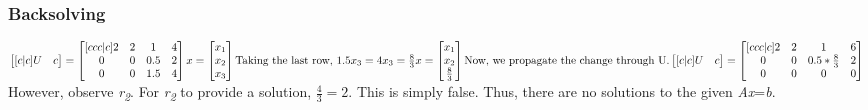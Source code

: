 \documentclass{article}
\begin{document}
\subsubsection{Backsolving}
\begin{math}
\begin{bmatrix}[c|c]U&c\end{bmatrix} = \begin{bmatrix}[ccc|c]2&2&1&4\\0&0&0.5&2\\0&0&1.5&4\end{bmatrix}\\\\
x = \begin{bmatrix}x_1\\x_2\\x_3\end{bmatrix}\\
\text{Taking the last row, }1.5x_3 = 4\\
x_3 = \frac{8}{3}\\
x = \begin{bmatrix}x_1\\x_2\\\frac{8}{3}\end{bmatrix}\\
\text{Now, we propagate the change through U.}\\
\begin{bmatrix}[c|c]U&c\end{bmatrix} = \begin{bmatrix}[ccc|c]2&2&1&6\\0&0&0.5*\frac{8}{3}&2\\0&0&0&0\end{bmatrix}\\\\
\end{math}
However, observe \emph{r\textsubscript{2}}. For \emph{r\textsubscript{2}} to provide a solution, \begin{math}\frac{4}{3} = 2\end{math}. This is simply false. Thus, there are no solutions to the given \emph{Ax}=\emph{b}.
\end{document}
